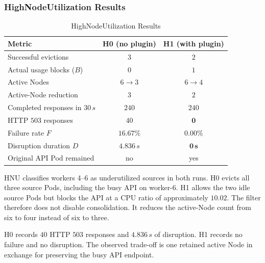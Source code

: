 \subsubsection{HighNodeUtilization Results}
\label{subsec:actualusage4_hnu_results}
\begin{table}[tbp]
    \centering
    \caption{HighNodeUtilization Results}
    \label{tab:actualusage4_hnu}
    \renewcommand{\arraystretch}{1.2}
    \small
    \begin{tabular}{@{}l c c@{}}
        \toprule
        \textbf{Metric} & \textbf{H0 (no plugin)} & \textbf{H1 (with plugin)} \\
        \midrule
        Successful evictions             & \(3\)       & \(2\) \\
        Actual usage blocks (\(B\))       & \(0\)       & \(1\) \\
        Active Nodes                      & \(6 \to 3\) & \(6 \to 4\) \\
        Active-Node reduction             & \(3\)       & \(2\) \\
        Completed responses in \(30\,s\)  & \(240\)     & \(240\) \\
        HTTP \(503\) responses            & \(40\)      & \(\mathbf{0}\) \\
        Failure rate \(F\)                & \(16.67\%\) & \(\mathbf{0.00\%}\) \\
        Disruption duration \(D\)         & \(4.836\,s\)& \(\mathbf{0\,s}\) \\
        Original API Pod remained         & no          & yes \\
        \bottomrule
    \end{tabular}
\end{table}

HNU classifies workers 4--6 as underutilized sources in both runs. H0 evicts all three source Pods, including the busy API on worker-6. H1 allows the two idle source Pods but blocks the API at a CPU ratio of approximately \(10.02\). The filter therefore does not disable consolidation. It reduces the active-Node count from six to four instead of six to three.

H0 records \(40\) HTTP \(503\) responses and \(4.836\,s\) of disruption. H1 records no failure and no disruption. The observed trade-off is one retained active Node in exchange for preserving the busy API endpoint.

